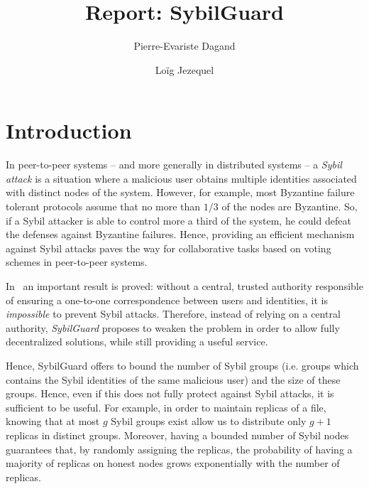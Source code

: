 \documentclass[a4paper,11pt]{article}
\title{Report: SybilGuard}
\author{Pierre-Evariste {\sc Dagand} \and Loïg {\sc Jezequel}}
\date{}
\begin{document}
\maketitle

\section*{Introduction}


In peer-to-peer systems -- and more generally in distributed systems
-- a \emph{Sybil attack} is a situation where a malicious user obtains
multiple identities associated with distinct nodes of the system.
However, for example, most Byzantine failure tolerant protocols assume
that no more than $1/3$ of the nodes are Byzantine.  So, if a Sybil
attacker is able to control more a third of the system, he could
defeat the defenses against Byzantine failures.  Hence, providing an
efficient mechanism against Sybil attacks paves the way for
collaborative tasks based on voting schemes in peer-to-peer systems.


In~\cite{douceur} an important result is proved: without a central,
trusted authority responsible of ensuring a one-to-one correspondence
between users and identities, it is \emph{impossible} to prevent Sybil
attacks. Therefore, instead of relying on a central authority,
\emph{SybilGuard} proposes to weaken the problem in order to allow
fully decentralized solutions, while still providing a useful service.


Hence, SybilGuard offers to bound the number of Sybil groups
(i.e. groups which contains the Sybil identities of the same malicious
user) and the size of these groups.  Hence, even if this does not
fully protect against Sybil attacks, it is sufficient to be useful.
For example, in order to maintain replicas of a file, knowing that at
most $g$ Sybil groups exist allow us to distribute only $g+1$ replicas
in distinct groups.  Moreover, having a bounded number of Sybil nodes
guarantees that, by randomly assigning the replicas, the probability of
having a majority of replicas on honest nodes grows exponentially with
the number of replicas.
\end{document}
